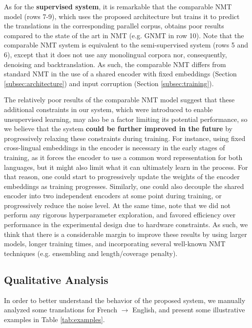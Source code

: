 \documentclass{article} \usepackage{iclr2018_conference,times}
\begin{document}
As for the \textbf{supervised system}, it is remarkable that the comparable NMT model (rows 7-9), which uses the proposed architecture but trains it to predict the translations in the corresponding parallel corpus, obtains poor results compared to the state of the art in NMT (e.g. GNMT in row 10). Note that the comparable NMT system is equivalent to the semi-supervised system (rows 5 and 6), except that it does not use any monolingual corpora nor, consequently, denoising and backtranslation. As such, the comparable NMT differs from standard NMT in the use of a shared encoder with fixed embeddings (Section \ref{subsec:architecture}) and input corruption (Section \ref{subsec:training}).

The relatively poor results of the comparable NMT model suggest that these additional constraints in our system, which were introduced to enable unsupervised learning, may also be a factor limiting its potential performance, so we believe that the system \textbf{could be further improved in the future} by progressively relaxing these constraints during training. For instance, using fixed cross-lingual embeddings in the encoder is necessary in the early stages of training, as it forces the encoder to use a common word representation for both languages, but it might also limit what it can ultimately learn in the process. For that reason, one could start to progressively update the weights of the encoder embeddings as training progresses. Similarly, one could also decouple the shared encoder into two independent encoders at some point during training, or progressively reduce the noise level. At the same time, note that we did not perform any rigorous hyperparameter exploration, and favored efficiency over performance in the experimental design due to hardware constraints. As such, we think that there is a considerable margin to improve these results by using larger models, longer training times, and incorporating several well-known NMT techniques (e.g. ensembling and length/coverage penalty).


\subsection{Qualitative Analysis}  \label{subsec:qualitative}

In order to better understand the behavior of the proposed system, we manually analyzed some translations for French $\rightarrow$ English, and present some illustrative examples in Table \ref{tab:examples}.
\end{document}
